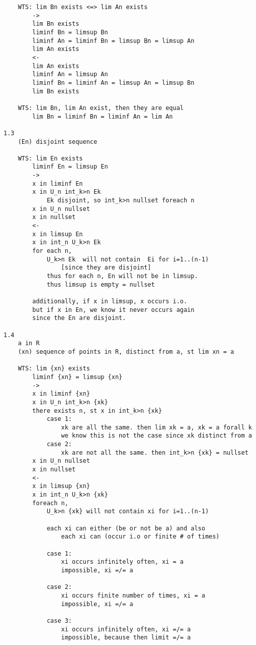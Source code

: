 \documentclass{article}
\begin{document}
\begin{flushleft}
\begin{verbatim}
    WTS: lim Bn exists <=> lim An exists 
        ->  
        lim Bn exists 
        liminf Bn = limsup Bn 
        liminf An = liminf Bn = limsup Bn = limsup An 
        lim An exists 
        <- 
        lim An exists 
        liminf An = limsup An 
        liminf Bn = liminf An = limsup An = limsup Bn 
        lim Bn exists 

    WTS: lim Bn, lim An exist, then they are equal 
        lim Bn = liminf Bn = liminf An = lim An 

1.3
    (En) disjoint sequence 

    WTS: lim En exists 
        liminf En = limsup En 
        -> 
        x in liminf En 
        x in U_n int_k>n Ek 
            Ek disjoint, so int_k>n nullset foreach n 
        x in U_n nullset 
        x in nullset 
        <- 
        x in limsup En 
        x in int_n U_k>n Ek
        for each n, 
            U_k>n Ek  will not contain  Ei for i=1..(n-1)
                [since they are disjoint]
            thus for each n, En will not be in limsup. 
            thus limsup is empty = nullset 
        
        additionally, if x in limsup, x occurs i.o.
        but if x in En, we know it never occurs again
        since the En are disjoint. 

1.4
    a in R 
    (xn) sequence of points in R, distinct from a, st lim xn = a

    WTS: lim {xn} exists 
        liminf {xn} = limsup {xn}
        -> 
        x in liminf {xn}
        x in U_n int_k>n {xk}
        there exists n, st x in int_k>n {xk}
            case 1: 
                xk are all the same. then lim xk = a, xk = a forall k
                we know this is not the case since xk distinct from a 
            case 2:
                xk are not all the same. then int_k>n {xk} = nullset 
        x in U_n nullset 
        x in nullset 
        <- 
        x in limsup {xn}
        x in int_n U_k>n {xk}
        foreach n, 
            U_k>n {xk} will not contain xi for i=1..(n-1)
            
            each xi can either (be or not be a) and also 
                each xi can (occur i.o or finite # of times)
            
            case 1:
                xi occurs infinitely often, xi = a 
                impossible, xi =/= a

            case 2: 
                xi occurs finite number of times, xi = a 
                impossible, xi =/= a

            case 3: 
                xi occurs infinitely often, xi =/= a 
                impossible, because then limit =/= a


\end{verbatim}
\end{flushleft}
\end{document}
